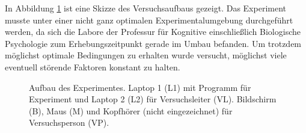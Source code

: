 \documentclass[doc,a4paper,12pt]{apa6}
\begin{document}
In Abbildung \ref{experiment} ist eine Skizze des Versuchsaufbaus gezeigt. Das Experiment musste unter einer nicht ganz optimalen Experimentalumgebung durchgeführt werden, da sich die Labore der Professur für Kognitive einschließlich Biologische Psychologie zum Erhebungszeitpunkt gerade im Umbau befanden. Um trotzdem möglichst optimale Bedingungen zu erhalten wurde versucht, möglichst viele eventuell störende Faktoren konstant zu halten.

\begin{figure}
  \centering
  \begin{minipage}{.55\textwidth}
    \setlength{\fboxsep}{.05\textwidth}
    \vspace{10pt}
    \caption{Aufbau des Experimentes. Laptop 1 (L1) mit Programm für Experiment und Laptop 2 (L2) für Versuchsleiter (VL). Bildschirm (B), Maus (M) und Kopfhörer (nicht eingezeichnet) für Versuchsperson (VP).}
    \label{experiment}
  \end{minipage}
\end{figure}
\end{document}
